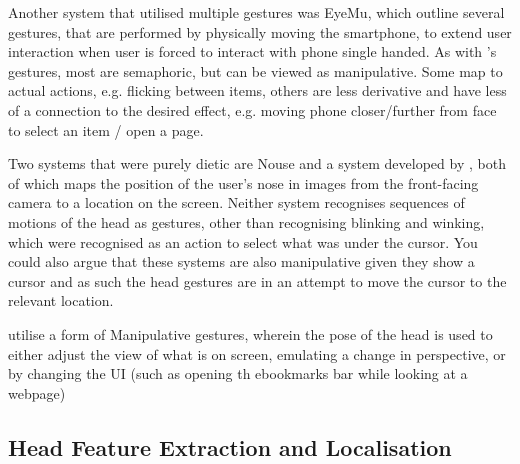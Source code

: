 Another system that utilised multiple gestures was EyeMu\cite{kong2021eyemu}, which outline several gestures, that are performed by physically moving the smartphone, to extend user interaction when user is forced to interact with phone single handed.
As with \citeauthor{yan2018headgesture}'s gestures, most are semaphoric, but can be viewed as manipulative.
Some map to actual actions, e.g. flicking between items, others are less derivative and have less of a connection to the desired effect, e.g. moving phone closer/further from face to select an item / open a page.

Two systems that were purely dietic are Nouse\cite{gorodnichy2004nouse} and a system developed by \citeauthor{varona2008hands}\cite{varona2008hands}, both of which maps the position of the user's nose in images from the front-facing camera to a location on the screen.
Neither system recognises sequences of motions of the head as gestures, other than recognising blinking and winking, which were recognised as an action to select what was under the cursor. 
You could also argue that these systems are also manipulative given they show a cursor and as such the head gestures are in an attempt to move the cursor to the relevant location.

\cite{lopez2012head} utilise a form of Manipulative gestures, wherein the pose of the head is used to either adjust the view of what is on screen, emulating a change in perspective, or by changing the UI (such as opening th ebookmarks bar while looking at a webpage)



\subsection{Head Feature Extraction and Localisation}

